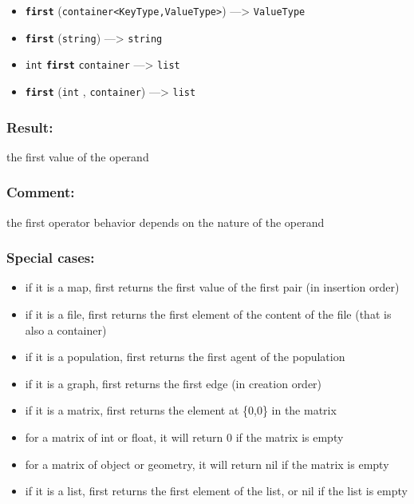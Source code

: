 \documentclass[]{book}
\providecommand{\tightlist}{%
  \setlength{\itemsep}{0pt}\setlength{\parskip}{0pt}}
\theoremstyle{definition}
\theoremstyle{definition}
\theoremstyle{definition}
\theoremstyle{remark}
\begin{document}
\begin{itemize}
\tightlist
\item
  \textbf{\texttt{first}}
  (\texttt{container\textless{}KeyType,ValueType\textgreater{}})
  ---\textgreater{} \texttt{ValueType}
\item
  \textbf{\texttt{first}} (\texttt{string}) ---\textgreater{}
  \texttt{string}
\item
  \texttt{int} \textbf{\texttt{first}} \texttt{container}
  ---\textgreater{} \texttt{list}
\item
  \textbf{\texttt{first}} (\texttt{int} , \texttt{container})
  ---\textgreater{} \texttt{list}
\end{itemize}

\subsubsection{Result:}\label{result-161}

the first value of the operand

\subsubsection{Comment:}\label{comment-37}

the first operator behavior depends on the nature of the operand

\subsubsection{Special cases:}\label{special-cases-61}

\begin{itemize}
\tightlist
\item
  if it is a map, first returns the first value of the first pair (in
  insertion order)\\
\item
  if it is a file, first returns the first element of the content of the
  file (that is also a container)\\
\item
  if it is a population, first returns the first agent of the
  population\\
\item
  if it is a graph, first returns the first edge (in creation order)\\
\item
  if it is a matrix, first returns the element at \{0,0\} in the
  matrix\\
\item
  for a matrix of int or float, it will return 0 if the matrix is
  empty\\
\item
  for a matrix of object or geometry, it will return nil if the matrix
  is empty\\
\item
  if it is a list, first returns the first element of the list, or nil
  if the list is empty
\end{itemize}
\end{document}
